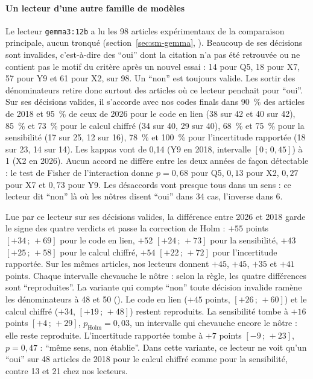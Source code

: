 \paragraph{Un lecteur d'une autre famille de modèles}\label{sec:sr-gemma}
Le lecteur \texttt{gemma3:12b} a lu les 98 articles expérimentaux de la comparaison principale, aucun
tronqué (section~\ref{sec:sm-gemma}, ). Beaucoup de ses décisions sont
invalides, c'est-à-dire des \enquote{oui} dont la citation n'a pas été retrouvée ou ne contient pas le
motif du critère après un nouvel essai : 14 pour Q5, 18 pour X7, 57 pour Y9 et 61 pour X2, sur 98. Un
\enquote{non} est toujours valide. Les sortir des dénominateurs retire donc surtout des articles où ce
lecteur penchait pour \enquote{oui}. Sur ses décisions valides, il s'accorde avec nos codes finals
dans 90~\% des articles de 2018 et 95~\% de ceux de 2026 pour le code en lien (38 sur 42 et 40 sur
42), 85~\% et 73~\% pour le calcul chiffré (34 sur 40, 29 sur 40), 68~\% et 75~\% pour la
sensibilité (17 sur 25, 12 sur 16), 78~\% et 100~\% pour l'incertitude rapportée (18 sur 23, 14 sur
14). Les kappas vont de 0,14 (Y9 en 2018, intervalle $[0\,;\,0{,}45]$) à 1 (X2 en 2026). Aucun accord
ne diffère entre les deux années de façon détectable : le test de Fisher de l'interaction donne
$p = 0{,}68$ pour Q5, $0{,}13$ pour X2, $0{,}27$ pour X7 et $0{,}73$ pour Y9. Les désaccords vont
presque tous dans un sens : ce lecteur dit \enquote{non} là où les nôtres disent \enquote{oui} dans 34
cas, l'inverse dans 6.

Lue par ce lecteur sur ses décisions valides, la différence entre 2026 et 2018 garde le signe des
quatre verdicts et passe la correction de Holm : $+55$ points $[+34\,;\,+69]$ pour le code en lien,
$+52$ $[+24\,;\,+73]$ pour la sensibilité, $+43$ $[+25\,;\,+58]$ pour le calcul chiffré, $+54$
$[+22\,;\,+72]$ pour l'incertitude rapportée. Sur les mêmes articles, nos lecteurs donnent $+45$,
$+45$, $+35$ et $+41$ points. Chaque intervalle chevauche le nôtre : selon la règle,
les quatre différences sont \enquote{reproduites}. La variante qui compte \enquote{non}
toute décision invalide ramène les dénominateurs à 48 et 50 ().
Le code en lien ($+45$ points, $[+26\,;\,+60]$) et le calcul chiffré ($+34$, $[+19\,;\,+48]$) restent
reproduits. La sensibilité tombe à $+16$ points $[+4\,;\,+29]$, $p_{\text{Holm}} = 0{,}03$, un
intervalle qui chevauche encore le nôtre : elle reste reproduite. L'incertitude rapportée tombe à $+7$
points $[-9\,;\,+23]$, $p = 0{,}47$ : \enquote{même sens, non établie}. Dans cette variante, ce
lecteur ne voit qu'un \enquote{oui} sur 48 articles de 2018 pour le calcul chiffré comme pour la
sensibilité, contre 13 et 21 chez nos lecteurs.

